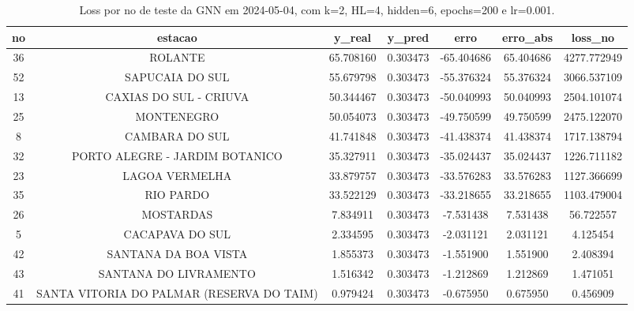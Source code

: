 \begin{table}[h]
\centering
\caption{Loss por no de teste da GNN em 2024-05-04, com k=2, HL=4, hidden=6, epochs=200 e lr=0.001.}
\label{tab:gnn_loss_k2_hl4_h6_e200_d20240504}
\begin{tabular}{ccccccc}
\toprule
no & estacao & y\_real & y\_pred & erro & erro\_abs & loss\_no \\
\midrule
36 & ROLANTE & 65.708160 & 0.303473 & -65.404686 & 65.404686 & 4277.772949 \\
52 & SAPUCAIA DO SUL & 55.679798 & 0.303473 & -55.376324 & 55.376324 & 3066.537109 \\
13 & CAXIAS DO SUL - CRIUVA & 50.344467 & 0.303473 & -50.040993 & 50.040993 & 2504.101074 \\
25 & MONTENEGRO & 50.054073 & 0.303473 & -49.750599 & 49.750599 & 2475.122070 \\
8 & CAMBARA DO SUL & 41.741848 & 0.303473 & -41.438374 & 41.438374 & 1717.138794 \\
32 & PORTO ALEGRE - JARDIM BOTANICO & 35.327911 & 0.303473 & -35.024437 & 35.024437 & 1226.711182 \\
23 & LAGOA VERMELHA & 33.879757 & 0.303473 & -33.576283 & 33.576283 & 1127.366699 \\
35 & RIO PARDO & 33.522129 & 0.303473 & -33.218655 & 33.218655 & 1103.479004 \\
26 & MOSTARDAS & 7.834911 & 0.303473 & -7.531438 & 7.531438 & 56.722557 \\
5 & CACAPAVA DO SUL & 2.334595 & 0.303473 & -2.031121 & 2.031121 & 4.125454 \\
42 & SANTANA DA BOA VISTA & 1.855373 & 0.303473 & -1.551900 & 1.551900 & 2.408394 \\
43 & SANTANA DO LIVRAMENTO & 1.516342 & 0.303473 & -1.212869 & 1.212869 & 1.471051 \\
41 & SANTA VITORIA DO PALMAR (RESERVA DO TAIM) & 0.979424 & 0.303473 & -0.675950 & 0.675950 & 0.456909 \\
\bottomrule
\end{tabular}
\end{table}
